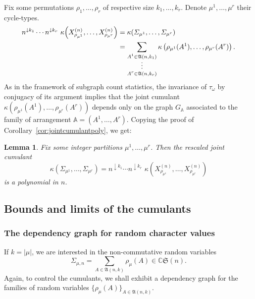\documentclass[12pt,a4paper,reqno]{amsart}
\newtheorem{lemma}{Lemma}[section]
\theoremstyle{remark}
\newcommand{\C}{\mathbb{C}}
\newcommand{\SubGraph}{X^{(n)}}
\newcommand{\fall}[1]{^{\downarrow #1}}
\newcommand{\arr}{\mathfrak{A}}
\newcommand{\sym}{\mathfrak{S}}
\begin{document}
Fix some permutations $\rho_1,\dots,\rho_r$ of respective size $k_1,\dots,k_r$. Denote $\mu^{1},\ldots,\mu^{r}$ their cycle-types.
\begin{align}
n\fall{k_{1}}\cdots n\fall{k_{r}}\,\,\kappa\!\left(\SubGraph_{\rho_{\mu^{1}}},\ldots,\SubGraph_{\rho_{\mu^{r}}}\right)&=\kappa(\varSigma_{\mu^{1}},\ldots,\varSigma_{\mu^{r}})\nonumber\\
&=\sum_{\substack{A^{1}\in \arr(n,k_{1}) \vspace{-1mm} \\ \vdots  \vspace{1mm}\\ A^{r} \in \arr(n,k_{r})}}
\kappa\left(\rho_{\mu^{1}}(A^{1}),\ldots,\rho_{\mu^{r}}(A^{r})\right).\label{eq:listequality}
\end{align}
As in the framework of subgraph count statistics,
the invariance of $\tau_\omega$ by conjugacy of its argument
implies that the joint cumulant $\kappa\left(\rho_{\mu^{1}}(A^{1}),\ldots,\rho_{\mu^{r}}(A^{r})\right)$
depends only on the graph $G_{\mathbb{A}}$ associated to the family of arrangement
$\mathbb{A}=(A^{1},\dots,A^{r})$.
Copying the proof of Corollary~\ref{cor:jointcumulantpoly},
we get:
\begin{lemma}\label{lem:cumulantcharacterpoly}
Fix some integer partitions  $\mu^1,\dots,\mu^r$. Then the rescaled joint cumulant 
$$\kappa(\varSigma_{\mu^{1}},\ldots,\varSigma_{\mu^{r}})=n\fall{k_{1}}\cdots n\fall{k_{r}}\,\,\kappa\!\left(\SubGraph_{\rho_{\mu^{1}}},\ldots,\SubGraph_{\rho_{\mu^{r}}}\right)
$$ 
is a polynomial in $n$.
\end{lemma}\bigskip



\subsection{Bounds and limits of the cumulants}\label{subsec:boundcumulantchmu} 
\subsubsection{The dependency graph for random character values} If $k=|\mu|$, we are interested in the non-commutative random variables
$$\varSigma_{\mu,n}=\sum_{A \in \arr(n,k)} \rho_{\mu}(A) \in \C\sym(n).$$
Again, to control the cumulants, we shall exhibit a dependency graph for the families of random variables $\{\rho_{\mu}(A)\}_{A \in \arr(n,k)}$.
\end{document}
